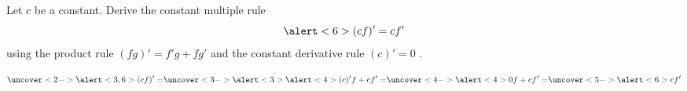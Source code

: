 \begin{frame}
\begin{example}
Let $c$ be a constant. Derive the constant multiple rule 
\[
\alert<6>{(cf)'=c f'}
\]
using the \alert<3>{product rule $(fg)'=f'g+fg'$} and the constant derivative rule $(c)'=0$ .

\[
\uncover<2->{\alert<3,6>{(cf)'}=} \uncover<3->{\alert<3>{\alert<4>{(c)'} f+ c f'}=}\uncover<4->{\alert<4>{0} f+cf'=}\uncover<5->{\alert<6>{cf'}}
\]
\end{example}

\end{frame}

